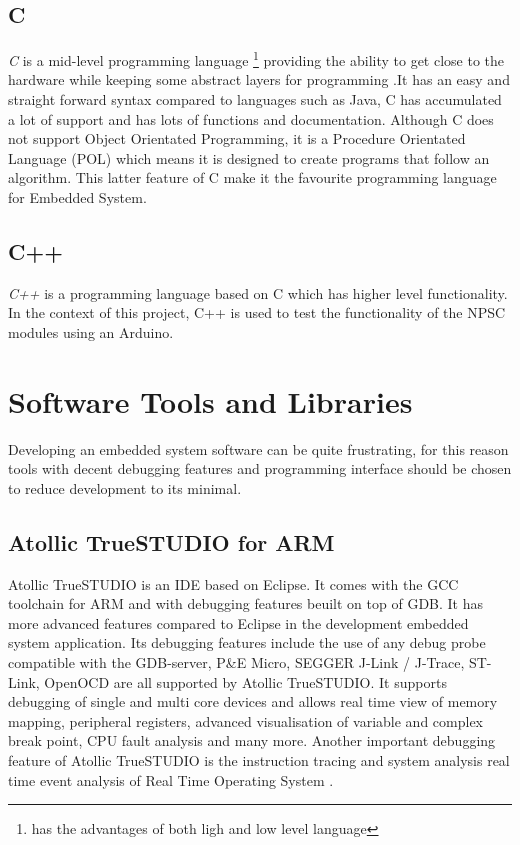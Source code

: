 \subsection{C}
\textit{C} is a mid-level programming language \footnote{has the advantages of both ligh and low level language} providing the ability to get close to the hardware while keeping some abstract layers for programming \cite{c_programming}.It has an easy and straight forward syntax compared to languages such as Java, C has accumulated a lot of support and has lots of functions and documentation. Although C does not support Object Orientated Programming, it is a Procedure Orientated Language (POL) which means it is designed to create programs that follow an algorithm. This latter feature of C make it the favourite programming language for Embedded System. 

\subsection{C++}
\textit{C++} is a programming language based on C which has higher level functionality. In the context of this project, C++ is used to test the functionality of the NPSC modules using an Arduino.

\section{Software Tools and Libraries}
Developing an embedded system software can be quite frustrating, for this reason tools with decent debugging features and programming interface should be chosen to reduce development to its minimal. 

\subsection{Atollic TrueSTUDIO for ARM}
Atollic TrueSTUDIO is an IDE based on Eclipse. It comes with the GCC toolchain for ARM and with debugging features beuilt on top of GDB. It has more advanced features compared to Eclipse in the development embedded system application. Its debugging features include the use of any debug probe compatible with the GDB-server, P\&E Micro, SEGGER J-Link / J-Trace, ST-Link, OpenOCD are all supported by Atollic TrueSTUDIO. It supports debugging of single and multi core devices and allows real time view of memory mapping, peripheral registers, advanced visualisation of variable and complex break point, CPU fault analysis and many more. Another important debugging feature of Atollic TrueSTUDIO is the instruction tracing and system analysis real time event analysis of Real Time Operating System \cite{atollic}.

